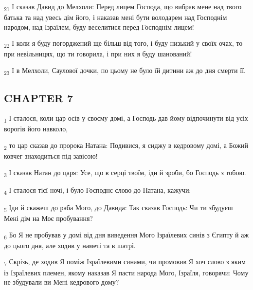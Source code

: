 \begin{tcolorbox}
\textsubscript{21} І сказав Давид до Мелхоли: Перед лицем Господа, що вибрав мене над твого батька та над увесь дім його, і наказав мені бути володарем над Господнім народом, над Ізраїлем, буду веселитися перед Господнім лицем!
\end{tcolorbox}
\begin{tcolorbox}
\textsubscript{22} І коли я буду погорджений ще більш від того, і буду низький у своїх очах, то при невільницях, що ти говорила, і при них я буду шанований!
\end{tcolorbox}
\begin{tcolorbox}
\textsubscript{23} І в Мелхоли, Саулової дочки, по цьому не було їй дитини аж до дня смерти її.
\end{tcolorbox}
\subsection{CHAPTER 7}
\begin{tcolorbox}
\textsubscript{1} І сталося, коли цар осів у своєму домі, а Господь дав йому відпочинути від усіх ворогів його навколо,
\end{tcolorbox}
\begin{tcolorbox}
\textsubscript{2} то цар сказав до пророка Натана: Подивися, я сиджу в кедровому домі, а Божий ковчег знаходиться під завісою!
\end{tcolorbox}
\begin{tcolorbox}
\textsubscript{3} І сказав Натан до царя: Усе, що в серці твоїм, іди й зроби, бо Господь з тобою.
\end{tcolorbox}
\begin{tcolorbox}
\textsubscript{4} І сталося тієї ночі, і було Господнє слово до Натана, кажучи:
\end{tcolorbox}
\begin{tcolorbox}
\textsubscript{5} Іди й скажеш до раба Мого, до Давида: Так сказав Господь: Чи ти збудуєш Мені дім на Моє пробування?
\end{tcolorbox}
\begin{tcolorbox}
\textsubscript{6} Бо Я не пробував у домі від дня виведення Мого Ізраїлевих синів з Єгипту й аж до цього дня, але ходив у наметі та в шатрі.
\end{tcolorbox}
\begin{tcolorbox}
\textsubscript{7} Скрізь, де ходив Я поміж Ізраїлевими синами, чи промовив Я хоч слово з яким із Ізраїлевих племен, якому наказав Я пасти народа Мого, Ізраїля, говорячи: Чому не збудували ви Мені кедрового дому?
\end{tcolorbox}
